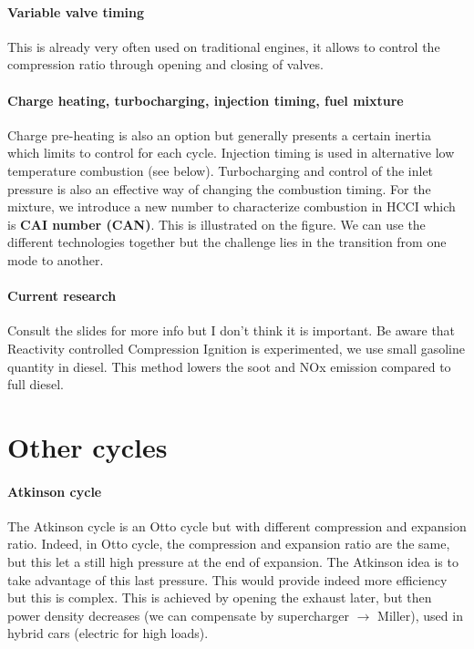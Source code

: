 	\paragraph{Variable valve timing}
	This is already very often used on traditional engines, it allows to control the compression ratio through opening and closing of valves. 
	
	\paragraph{Charge heating, turbocharging, injection timing, fuel mixture}
	Charge pre-heating is also an option but generally presents a certain inertia which limits to control for each cycle. Injection timing is used in alternative low temperature combustion (see below). Turbocharging and control of the inlet pressure is also an effective way of changing the combustion timing. For the mixture, we introduce a new number to characterize combustion in HCCI which is \textbf{CAI number (CAN)}. This is illustrated on the figure. We can use the different technologies together but the challenge lies in the transition from one mode to another.
	
	\paragraph{Current research} Consult the slides for more info but I don't think it is important. Be aware that Reactivity controlled Compression Ignition is experimented, we use small gasoline quantity in diesel. This method lowers the soot and NOx emission compared to full diesel. 

\section{Other cycles}
\paragraph{Atkinson cycle}
	The Atkinson cycle is an Otto cycle but with different compression and expansion ratio. Indeed, in Otto cycle, the compression and expansion ratio are the same, but this let a still high pressure at the end of expansion. The Atkinson idea is to take advantage of this last pressure. This would provide indeed more efficiency but this is complex. This is achieved by opening the exhaust later, but then power density decreases (we can compensate by supercharger $\rightarrow$ Miller), used in hybrid cars (electric for high loads). 


